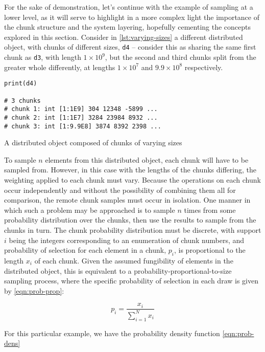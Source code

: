 For the sake of demonstration, let's continue with the example of
sampling at a lower level, as it will serve to highlight in a more
complex light the importance of the chunk structure and the system
layering, hopefully cementing the concepts explored in this section.
Consider in \cref{lst:varying-sizes} a different distributed object, with chunks of different sizes,
\texttt{d4} -- consider this as sharing the same first chunk as
\texttt{d3}, with length \(1 \times 10^9\), but the second and third
chunks split from the greater whole differently, at lengths
\(1 \times 10^7\) and \(9.9 \times 10^8\) respectively.

\begin{listing}
    \begin{verbatim}
print(d4)

# 3 chunks
# chunk 1: int [1:1E9] 304 12348 -5899 ...
# chunk 2: int [1:1E7] 3284 23984 8932 ...
# chunk 3: int [1:9.9E8] 3874 8392 2398 ...
    \end{verbatim}
    \caption{A distributed object composed of chunks of varying sizes}
    \label{lst:varying-sizes}
\end{listing}

To sample \(n\) elements from this distributed object, each chunk will
have to be sampled from. However, in this case with the lengths of the
chunks differing, the weighting applied to each chunk must vary. Because
the operations on each chunk occur independently and without the
possibility of combining them all for comparison, the remote chunk
samples must occur in isolation. One manner in which such a problem may
be approached is to sample \(n\) times from some probability
distribution over the chunks, then use the results to sample from the
chunks in turn. The chunk probability distribution must be discrete,
with support \(i\) being the integers corresponding to an enumeration of
chunk numbers, and probability of selection for each element in a chunk,
\(p_i\), is proportional to the length \(x_i\) of each chunk. Given the
assumed fungibility of elements in the distributed object, this is
equivalent to a probability-proportional-to-size sampling process, where
the specific probability of selection in each draw is given by \cref{eqn:prob-prop}:

\begin{equation}\label{eqn:prob-prop}
    p_i = \frac{x_i}{\sum_{i=1}^{N}x_i}
\end{equation}

For this particular example, we have the probability density
function \cref{eqn:prob-dens}


